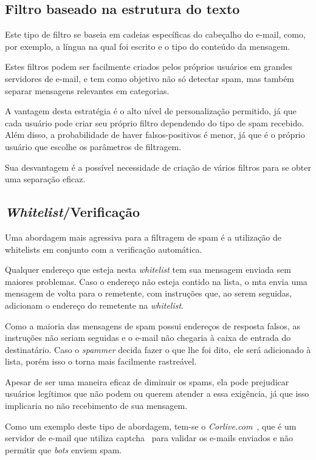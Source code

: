 \documentclass[a4paper,dvipdfm]{article}
\begin{document}
	\subsection{Filtro baseado na estrutura do texto}
		Este tipo de filtro se baseia em cadeias específicas do cabeçalho do e-mail, como, por exemplo, a língua na qual foi escrito e o tipo do conteúdo da mensagem.

		Estes filtros podem ser facilmente criados pelos próprios usuários em grandes servidores de e-mail, e tem como objetivo não só detectar spam, mas também separar mensagens relevantes em categorias.

		A vantagem desta estratégia é o alto nível de personalização permitido, já que cada usuário pode criar seu próprio filtro dependendo do tipo de spam recebido. 
		Além disso, a probabilidade de haver falsos-positivos é menor, já que é o próprio usuário que escolhe os parâmetros de filtragem.
		
		Sua desvantagem é a possível necessidade de criação de vários filtros para se obter uma separação eficaz.


	\subsection{\emph{Whitelist}/Verificação}
		Uma abordagem mais agressiva para a filtragem de spam é a utilização de \glspl{whitelist} em conjunto com a verificação automática.

		Qualquer endereço que esteja nesta \emph{whitelist} tem sua mensagem enviada sem maiores problemas.
		Caso o endereço não esteja contido na lista, o \gls{mta} envia uma mensagem de volta para o remetente, com instruções que, ao serem seguidas, adicionam o endereço do remetente na \emph{whitelist}.

		Como a maioria das mensagens de spam possui endereços de resposta falsos, as instruções não seriam seguidas e o e-mail não chegaria à caixa de entrada do destinatário.
		Caso o \emph{spammer} decida fazer o que lhe foi dito, ele será adicionado à lista, porém isso o torna mais facilmente rastreável.
		
		Apesar de ser uma maneira eficaz de diminuir os spams, ela pode prejudicar usuários legítimos que não podem ou querem atender a essa exigência, já que isso implicaria no não recebimento de sua mensagem.

		Como um exemplo deste tipo de abordagem, tem-se o \emph{Corlive.com}~\cite{corlive}, que é um servidor de e-mail que utiliza \gls{captcha}~\cite{captcha} para validar os e-mails enviados e não permitir que \emph{bots} enviem spam.
\end{document}
